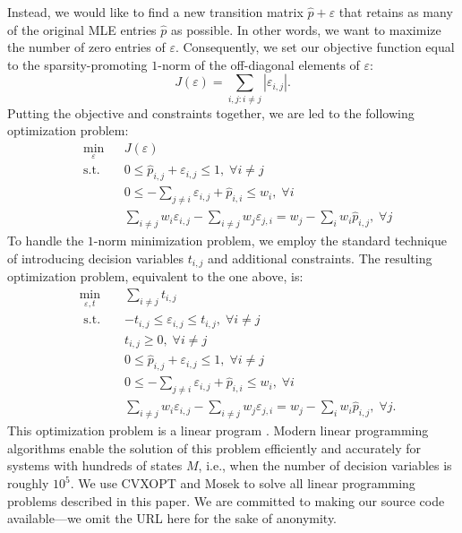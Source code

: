 \documentclass[review,letterpaper,11pt]{elsarticle}
\begin{document}
Instead, we would like to find a new transition matrix $\widehat{p} + \varepsilon$ that retains as many of the original MLE entries $\widehat{p}$ as possible.  In other words, we want to maximize the number of zero entries of $\varepsilon$.  Consequently, we set our objective function equal to the sparsity-promoting $1$-norm of the off-diagonal elements of $\varepsilon$:
\begin{equation*}
J(\varepsilon) = \sum_{i,j : i \neq j} |\varepsilon_{i,j}|.
\end{equation*}
Putting the objective and constraints together, we are led to the following optimization problem:
\begin{equation}
\label{eqn:dtmcopt1}
\begin{aligned}
& \underset{\varepsilon}{\text{min}}
& & J(\varepsilon) \\
& \text{s.t.}
& & 0 \leq \widehat{p}_{i,j} + \varepsilon_{i,j} \leq 1, \; \forall i \neq j \\
&&& 0 \leq -\sum_{j \neq i} \varepsilon_{i,j} + \widehat{p}_{i,i} \leq w_i, \; \forall i \\
&&& \sum_{i \neq j} w_i \varepsilon_{i,j} - \sum_{i \neq j} w_j \varepsilon_{j,i} = w_j - \sum_i w_i \widehat{p}_{i,j}, \; \forall j
\end{aligned}
\end{equation}
To handle the $1$-norm minimization problem, we employ the standard technique of introducing decision variables $t_{i,j}$ and additional constraints.  The resulting optimization problem, equivalent to the one above, is:
\begin{equation}
\label{eqn:dtmcopt2}
\begin{aligned}
& \underset{\varepsilon, t}{\text{min}}
& & \sum_{i \neq j} t_{i,j} \\
& \text{ s.t. } 
& & -t_{i,j} \leq \varepsilon_{i,j} \leq t_{i,j}, \;  \forall i \neq j\\
&&& t_{i,j} \geq 0, \; \forall i \neq j \\
&&& 0 \leq \widehat{p}_{i,j}+\varepsilon_{i,j} \leq 1, \; \forall i \neq j\\
&&& 0 \leq -\sum_{j \neq i} \varepsilon_{i,j} + \widehat{p}_{i,i} \leq w_i, \; \forall i \\
&&& \sum_{i \neq j} w_i \varepsilon_{i,j} - \sum_{i \neq j} w_j \varepsilon_{j,i} = w_j - \sum_i w_i \widehat{p}_{i,j}, \;  \forall j.
\end{aligned}
\end{equation}
This optimization problem is a linear program \cite{Nocedal2006}. Modern linear programming algorithms enable the solution of this problem efficiently and accurately for systems with hundreds of states $M$, i.e., when the number of decision variables is roughly $10^5$.  We use CVXOPT \cite{cvxopt} and Mosek \cite{mosek} to solve all linear programming problems described in this paper.  We are committed to making our source code available---we omit the URL here for the sake of anonymity.
\end{document}
